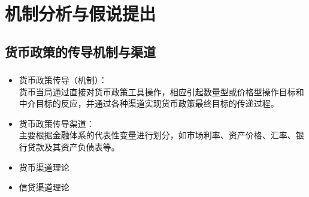 \documentclass[12pt,aspectratio=169]{ctexbeamer}
\begin{document}
			\section{机制分析与假说提出}
			\subsection{货币政策的传导机制与渠道}
			\begin{frame}
	 			\frametitle{}
				\begin{itemize}
					\justifying
					\item 货币政策传导（机制）：\\
					{\normalsize 货币当局通过直接对货币政策工具操作，相应引起数量型或价格型操作目标和中介目标的反应，并通过各种渠道实现货币政策最终目标的传递过程。}
					\item 货币政策传导渠道：\\
					{\normalsize 主要根据金融体系的代表性变量进行划分，如市场利率、资产价格、汇率、银行贷款及其资产负债表等。}
					\item 货币渠道理论
					\item 信贷渠道理论
				\end{itemize}
			\end{frame}
\end{document}
